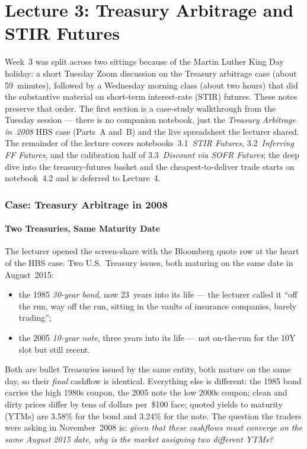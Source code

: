 \part*{Lecture 3: Treasury Arbitrage and STIR Futures}

Week~3 was split across two sittings because of the Martin Luther King Day
holiday: a short Tuesday Zoom discussion on the Treasury arbitrage case
(about 59~minutes), followed by a Wednesday morning class (about two hours)
that did the substantive material on short-term interest-rate (STIR) futures.
These notes preserve that order. The first section is a case-study walkthrough
from the Tuesday session --- there is no companion notebook, just the
\emph{Treasury Arbitrage in~2008} HBS case (Parts~A and~B) and the live
spreadsheet the lecturer shared. The remainder of the lecture covers
notebooks~3.1~\emph{STIR Futures}, 3.2~\emph{Inferring FF Futures}, and the
calibration half of 3.3~\emph{Discount via SOFR Futures}; the deep dive into
the treasury-futures basket and the cheapest-to-deliver trade starts on
notebook~4.2 and is deferred to Lecture~4.

\section{Case: Treasury Arbitrage in 2008}\label{L3-sec:case}

\subsection{Two Treasuries, Same Maturity Date}\label{L3-sec:case-setup}

The lecturer opened the screen-share with the Bloomberg quote row at the
heart of the HBS case. Two U.S.~Treasury issues, both maturing on the same
date in August~2015:

\begin{itemize}
  \item the 1985 \emph{30-year bond}, now 23~years into its life --- the
        lecturer called it ``off the run, way off the run, sitting in the
        vaults of insurance companies, barely trading'';
  \item the 2005 \emph{10-year note}, three years into its life --- not
        on-the-run for the 10Y slot but still recent.
\end{itemize}

Both are bullet Treasuries issued by the same entity, both mature on the
same day, so their \emph{final} cashflow is identical. Everything else is
different: the 1985 bond carries the high 1980s coupon, the 2005 note the
low 2000s coupon; clean and dirty prices differ by tens of dollars per~\$100
face; quoted yields to maturity (YTMs) are 3.58\% for the bond and
3.24\% for the note. The question the traders were asking in
November~2008 is: \emph{given that these cashflows must converge on the same
August 2015 date, why is the market assigning two different YTMs?}

